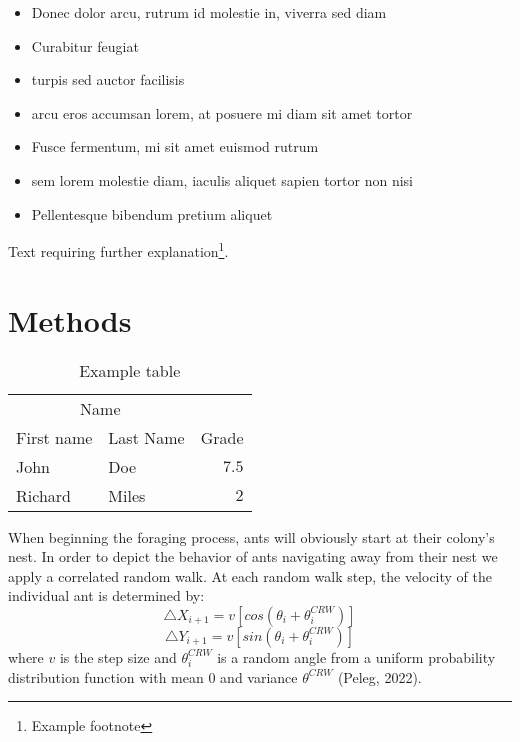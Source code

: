 \documentclass[twoside,twocolumn]{article}
\begin{document}
\begin{itemize}
\item Donec dolor arcu, rutrum id molestie in, viverra sed diam
\item Curabitur feugiat
\item turpis sed auctor facilisis
\item arcu eros accumsan lorem, at posuere mi diam sit amet tortor
\item Fusce fermentum, mi sit amet euismod rutrum
\item sem lorem molestie diam, iaculis aliquet sapien tortor non nisi
\item Pellentesque bibendum pretium aliquet
\end{itemize}
\blindtext %

Text requiring further explanation\footnote{Example footnote}.


\section{Methods}

\begin{table}
\caption{Example table}
\centering
\begin{tabular}{llr}
\toprule
\multicolumn{2}{c}{Name} \\
\cmidrule(r){1-2}
First name & Last Name & Grade \\
\midrule
John & Doe & $7.5$ \\
Richard & Miles & $2$ \\
\bottomrule
\end{tabular}
\end{table}

When beginning the foraging process, ants will obviously start at their colony's nest. In order to depict the behavior of ants navigating away from their nest we apply a correlated random walk. At each random walk step, the velocity of the individual ant is determined by: 
\begin{equation}
  \label{eq:crwx}
  \triangle X_{i+1} = v[cos(\theta_i+\theta_i^{CRW})]
\end{equation}
\begin{equation}
  \label{eq:crwy}
  \triangle Y_{i+1} = v[sin(\theta_i+\theta_i^{CRW})]
\end{equation}
where $v$ is the step size and $\theta_i^{CRW}$ is a random angle from a uniform probability distribution function with mean $0$ and variance $\theta^{CRW}$ (Peleg, 2022).
\end{document}
